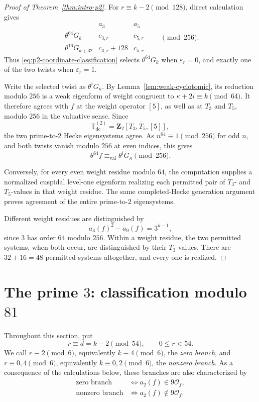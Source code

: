 \documentclass[11pt]{article}
\theoremstyle{plain}
\theoremstyle{definition}
\theoremstyle{remark}
\numberwithin{equation}{section}
\begin{document}
\begin{proof}[Proof of Theorem~\ref{thm:intro-p2}] For \(r\equiv k-2\pmod{128}\), direct calculation gives
\[
\begin{array}{c|cc}
 & a_3 & a_5\\ \hline
\theta^{64}G_k
 & c_{3,r} & c_{5,r}\\
\theta^{16}G_{k+32}
 & c_{3,r}+128 & c_{5,r}
\end{array}
\qquad\pmod{256}.
\]
Thus \eqref{eq:p2-coordinate-classification} selects \(\theta^{64}G_k\) when \(\varepsilon_r=0\), and exactly one of the two twists when \(\varepsilon_r=1\). 

Write the selected twist as \(\theta^iG_\kappa\). By Lemma~\ref{lem:weak-cyclotomic}, its reduction modulo \(256\) is a weak eigenform of weight congruent to \(\kappa+2i\equiv k\pmod{64}\). It therefore agrees with \(f\) at the weight operator \([5]\), as well as at \(T_3\) and \(T_5\), modulo \(256\) in the valuative sense. Since \[ \mathbb T_{\mathrm{dc}}^{(2)} =\overline{\mathbf Z_2[T_3,T_5,[5]]}, \] the two prime-to-\(2\) Hecke eigensystems agree. As \(n^{64}\equiv1\pmod{256}\) for odd \(n\), and both twists vanish modulo \(256\) at even indices, this gives \[ \theta^{64}f \equiv_{\mathrm{val}}\theta^iG_\kappa\pmod{256}. \] 

Conversely, for every even weight residue modulo \(64\), the computation supplies a normalized cuspidal level-one eigenform realizing each permitted pair of \(T_3\)- and \(T_5\)-values in that weight residue. The same completed-Hecke generation argument proves agreement of the entire prime-to-\(2\) eigensystems.

Different weight residues are distinguished by \[ a_3(f)^2-a_9(f)=3^{k-1}, \] since \(3\) has order \(64\) modulo \(256\). Within a weight residue, the two permitted systems, when both occur, are distinguished by their \(T_3\)-values. There are \(32+16=48\) permitted systems altogether, and every one is realized.
\end{proof}

\section{The prime \texorpdfstring{\(3\)}{3}: classification modulo \texorpdfstring{\(81\)}{81}} \label{sec:p3} 

Throughout this section, put \[ r\equiv d=k-2\pmod{54},\qquad 0\leq r<54. \] We call \(r\equiv2\pmod6\), equivalently \(k\equiv4\pmod6\), the \emph{zero branch}, and \(r\equiv0,4\pmod6\), equivalently \(k\equiv0,2\pmod6\), the \emph{nonzero branch}. As a consequence of the calculations below, these branches are also characterized by \[\begin{aligned} \text{zero branch} &\Longleftrightarrow a_2(f)\in9\mathcal O_f,\\ \text{nonzero branch} &\Longleftrightarrow a_2(f)\notin9\mathcal O_f. \end{aligned} \]
\end{document}

